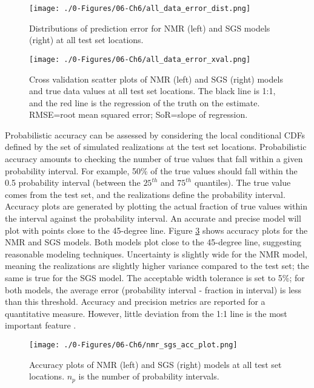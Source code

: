 \begin{figure}[htb!]
    \centering
    \texttt{[image: ./0-Figures/06-Ch6/all\_data\_error\_dist.png]}
    \caption{Distributions of prediction error for \gls{NMR} (left) and \gls{SGS} models (right) at all test set locations. }
    \label{fig:all_data_error_dist}
\end{figure}

\begin{figure}[htb!]
    \centering
    \texttt{[image: ./0-Figures/06-Ch6/all\_data\_error\_xval.png]}
    \caption{Cross validation scatter plots of  \gls{NMR} (left) and \gls{SGS} (right) models and true data values at all test set locations. The black line is 1:1, and the red line is the regression of the truth on the estimate. RMSE=root mean squared error; SoR=slope of regression.}
    \label{fig:all_data_error_xval}
\end{figure}

Probabilistic accuracy can be assessed by considering the local conditional \glspl{CDF} defined by the set of simulated realizations at the test set locations. Probabilistic accuracy amounts to checking the number of true values that fall within a given probability interval. For example, 50\% of the true values should fall within the 0.5 probability interval (between the $25^{th}$ and  $75^{th}$ quantiles). The true value comes from the test set, and the realizations define the probability interval. Accuracy plots are generated by plotting the actual fraction of true values within the interval against the probability interval. An accurate and precise model will plot with points close to the 45-degree line. Figure \ref{fig:nmr_sgs_acc_plot} shows accuracy plots for the \gls{NMR} and \gls{SGS} models. Both models plot close to the 45-degree line, suggesting reasonable modeling techniques. Uncertainty is slightly wide for the \gls{NMR} model, meaning the realizations are slightly higher variance compared to the test set; the same is true for the \gls{SGS} model. The acceptable width tolerance is set to 5\%; for both models, the average error (probability interval - fraction in interval) is less than this threshold. Accuracy and precision metrics are reported for a quantitative measure. However, little deviation from the 1:1 line is the most important feature \citep{deutsch2010display} .

\begin{figure}[htb!]
    \centering
    \texttt{[image: ./0-Figures/06-Ch6/nmr\_sgs\_acc\_plot.png]}
    \caption{Accuracy plots of  \gls{NMR} (left) and \gls{SGS} (right) models at all test set locations. $n_{p}$ is the number of probability intervals. }
    \label{fig:nmr_sgs_acc_plot}
\end{figure}


